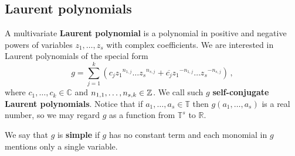 \subsection{Laurent polynomials}

A multivariate \textbf{Laurent polynomial} is a polynomial in positive
and negative powers of variables $z_1,\ldots,z_s$ with complex
coefficients.  We are interested in Laurent polynomials of the special form
\[ g = \sum_{j=1}^k \left( c_j {z_1}^{n_{1,j}}\ldots {z_s}^{n_{s,j}} +
    \overline{c_j} {z_1}^{-n_{1,j}}\ldots {z_s}^{-n_{s,j}} \right) \,
  ,\] where $c_1,\ldots,c_k \in \mathbb{C}$ and
$n_{1,1},\ldots,n_{s,k} \in \mathbb{Z}$.  We call such $g$
\textbf{self-conjugate Laurent polynomials}.  Notice that if
$a_1,\ldots,a_s \in \mathbb{T}$ then $g(a_1,\ldots,a_s)$ is a real
number, so we may regard $g$ as a function from $\mathbb{T}^s$ to
$\mathbb{R}$.

We say that $g$ is \textbf{simple} if $g$ has no constant term and
each monomial in $g$ mentions only a single variable.

